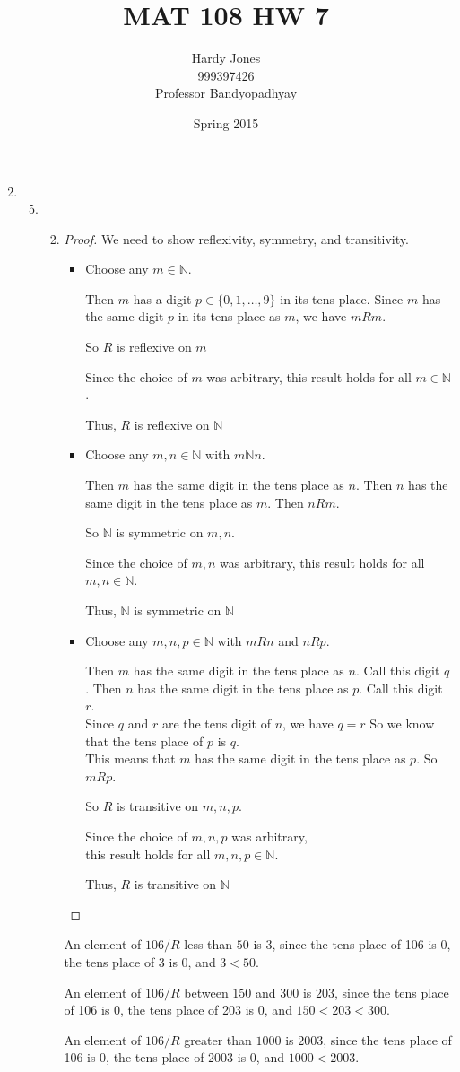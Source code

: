 \documentclass[12pt,letterpaper]{article}
\title{MAT 108 HW 7\vspace{-2ex}}
\author{Hardy Jones\\
        999397426\\
        Professor Bandyopadhyay\vspace{-2ex}}
\date{Spring 2015}
\newcommand*\reflexive[4]{%
  Choose any $#3 \in #1$.

  #4

  So $#2$ is reflexive on $#3$

  Since the choice of $#3$ was arbitrary,
  this result holds for all $#3 \in #1$.

  Thus, $#2$ is reflexive on $#1$
}
\newcommand*\symmetric[5]{%
  Choose any $#3, #4 \in #1$ with $#3 #1 #4$.

  #5

  So $#1$ is symmetric on $#3, #4$.

  Since the choice of $#3, #4$ was arbitrary,
  this result holds for all $#3, #4 \in #1$.

  Thus, $#1$ is symmetric on $#1$
}
\newcommand*\transitive[6]{%
  Choose any $#3, #4, #5 \in #1$ with $#3 #2 #4$ and $#4 #2 #5$.

  #6

  So $#2$ is transitive on $#3, #4, #5$.

  Since the choice of $#3, #4, #5$ was arbitrary, \\
  this result holds for all $#3, #4, #5 \in #1$.

  Thus, $#2$ is transitive on $#1$
}
\newcommand*\equivrel[8]{%
  \begin{itemize}
    \item \reflexive{#1}{#2}{#3}{#6}
    \item \symmetric{#1}{#2}{#3}{#4}{#7}
    \item \transitive{#1}{#2}{#3}{#4}{#5}{#8}
  \end{itemize}
}
\begin{document}
  \maketitle

  \begin{enumerate}
    \setcounter{enumi}{1}
    \item
      \begin{enumerate}
        \setcounter{enumii}{4}
        \item
          \begin{enumerate}
            \setcounter{enumiii}{1}
            \item
              \begin{proof}
                We need to show reflexivity, symmetry, and transitivity.

                \equivrel{\mathbb{N}}{R}{m}{n}{p}{
                  Then $m$ has a digit $p \in \{0, 1, \dots, 9\}$ in its tens place.
                  Since $m$ has the same digit $p$ in its tens place as $m$,
                  we have $m R m$.
                }{
                  Then $m$ has the same digit in the tens place as $n$.
                  Then $n$ has the same digit in the tens place as $m$.
                  Then $n R m$.
                }{
                  Then $m$ has the same digit in the tens place as $n$.
                  Call this digit $q$.
                  Then $n$ has the same digit in the tens place as $p$.
                  Call this digit $r$.\\
                  Since $q$ and $r$ are the tens digit of $n$, we have $q = r$
                  So we know that the tens place of $p$ is $q$. \\
                  This means that $m$ has the same digit in the tens place as $p$.
                  So $m R p$.
                }
              \end{proof}

              An element of $106 / R$ less than $50$ is $3$,
              since the tens place of 106 is 0, the tens place of 3 is 0, and $3 < 50$.

              An element of $106 / R$ between $150$ and $300$ is $203$,
              since the tens place of 106 is 0, the tens place of 203 is 0, and $150 < 203 < 300$.

              An element of $106 / R$ greater than $1000$ is $2003$,
              since the tens place of 106 is 0, the tens place of 2003 is 0, and $1000 < 2003$.


\end{enumerate}
\end{enumerate}
\end{enumerate}
\end{document}

